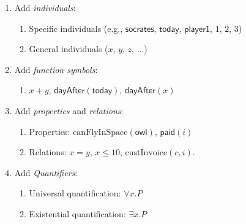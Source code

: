 \documentclass[xetex,aspectratio=169,14pt,hyperref={pdfpagelabels=true,pdflang={en-GB}}]{beamer}
\begin{document}
\begin{frame}[t]

  \begin{enumerate}
  \item Add \emph{individuals}:
    \begin{enumerate}
    \item Specific individuals (e.g., $\mathsf{socrates}$, $\mathsf{today}$, $\mathsf{player1}$, $1$, $2$, $3$) \\
    \item General individuals ($x$, $y$, $z$, ...) \\
    \end{enumerate}

    \bigskip

  \item Add \emph{function symbols}:
    \begin{enumerate}
    \item $x + y$, $\mathsf{dayAfter}(\mathsf{today})$, $\mathsf{dayAfter}(x)$
    \end{enumerate}

    \bigskip

  \item Add \emph{properties} and \emph{relations}:
    \begin{enumerate}
    \item Properties: $\mathrm{canFlyInSpace}(\mathsf{owl})$, $\mathsf{paid}(i)$
    \item Relations: $x = y$, $x \leq 10$, $\mathrm{custInvoice}(c, i)$.
    \end{enumerate}

    \bigskip

  \item Add \emph{Quantifiers}:
    \begin{enumerate}
    \item Universal quantification: $\forall x. P$
    \item Existential quantification: $\exists x. P$
    \end{enumerate}

  \end{enumerate}
\end{frame}
\end{document}
